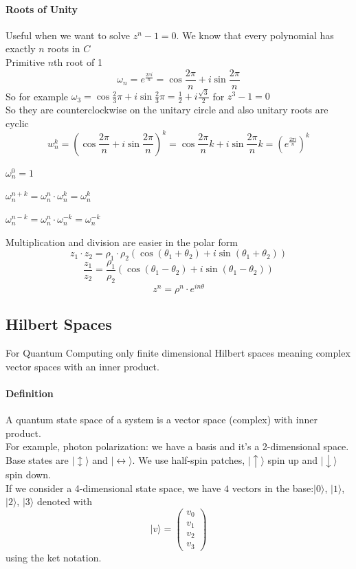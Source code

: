 \documentclass[10pt]{report}
\begin{document}
\paragraph{Roots of Unity} Useful when we want to solve $z^n - 1 = 0$. We know that every polynomial has exactly $n$ roots in $C$\\
Primitive $n$th root of 1
$$\omega_n = e^{\frac{2\pi i}{n}} = \cos \frac{2\pi}{n} + i \sin\frac{2\pi}{n}$$
So for example $\omega_3 = \cos\frac{2}{3}\pi + i\sin\frac{2}{3}\pi = \frac{1}{2}+i\frac{\sqrt{3}}{2}$ for $z^3 - 1 = 0$\\
So they are counterclockwise on the unitary circle and also unitary roots are cyclic
$$w_n^k = (\cos \frac{2\pi}{n} + i \sin\frac{2\pi}{n})^k = \cos\frac{2\pi}{n}k + i \sin\frac{2\pi}{n}k = \left(e^{\frac{2\pi i}{n}}\right)^k$$
\begin{list}{}{}
	\item $\omega_n^0 = 1$
	\item $\omega_n^{n+k} = \omega_n^n \cdot \omega_n^k = \omega_n^k$
	\item $\omega_n^{n-k} = \omega_n^n \cdot \omega_n^{-k} = \omega_n^{-k}$
\end{list}
Multiplication and division are easier in the polar form
$$z_1\cdot z_2 = \rho_1\cdot\rho_2(\cos(\theta_1+\theta_2) + i\sin(\theta_1+\theta_2))$$
$$\frac{z_1}{z_2} = \frac{\rho_1}{\rho_2}(\cos(\theta_1-\theta_2) + i\sin(\theta_1-\theta_2))$$
$$z^n = \rho^n\cdot e^{in\theta}$$
\subsection{Hilbert Spaces} For Quantum Computing only finite dimensional Hilbert spaces meaning complex vector spaces with an inner product.
\paragraph{Definition} A quantum state space of a system is a vector space (complex) with inner product.\\
For example, photon polarization: we have a basis and it's a 2-dimensional space. Base states are $|\updownarrow\rangle$ and $|\leftrightarrow\rangle$. We use half-spin patches, $|\uparrow\rangle$ spin up and $|\downarrow\rangle$ spin down.\\
If we consider a 4-dimensional state space, we have $4$ vectors in the base:$|0\rangle$, $|1\rangle$, $|2\rangle$, $|3\rangle$ denoted with $$|v\rangle=\left(\begin{array}{c}
v_0\\v_1\\v_2\\v_3
\end{array}\right)$$ using the ket notation.
\end{document}
